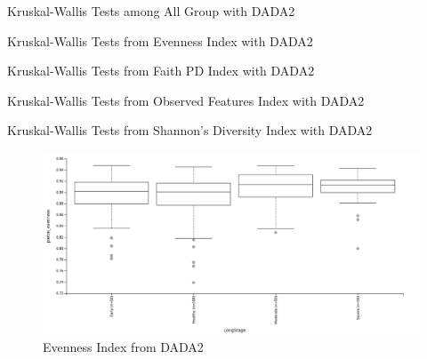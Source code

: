 \documentclass[a4paper]{article}
\begin{document}
            \begin{table}[p]
                \centering
                \caption{Kruskal-Wallis Tests among All Group with DADA2}
                \label{tb:alpha-all-dada2}
            \end{table}

            \begin{table}[p]
                \centering
                \caption{Kruskal-Wallis Tests from Evenness Index with DADA2}
                \label{tb:alpha-evenness-dada2}
            \end{table}

            \begin{table}[p]
                \centering
                \caption{Kruskal-Wallis Tests from Faith PD Index with DADA2}
                \label{tb:alpha-faith-dada2}
            \end{table}

            \begin{table}[p]
                \centering
                \caption{Kruskal-Wallis Tests from Observed Features Index with DADA2}
                \label{tb:alpha-observed-dada2}
            \end{table}

            \begin{table}[p]
                \centering
                \caption{Kruskal-Wallis Tests from Shannon's Diversity Index with DADA2}
                \label{tb:alpha-shannon-dada2}
            \end{table}

            \begin{figure}[p]
                \centering
                \includegraphics[width=0.8 \linewidth]{figures/AlphaDiversity/DADA2/evenness.png}
                \caption{Evenness Index from DADA2}
                \label{fig:evenness-dada2}
            \end{figure}
\end{document}
